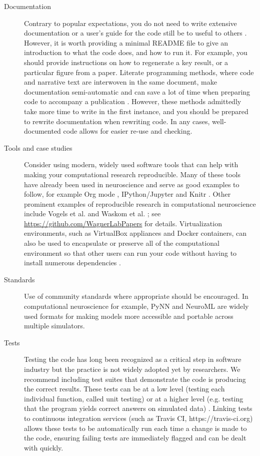 \documentclass[11pt]{article}
\begin{document}
\begin{description}
\item [Documentation] Contrary to popular expectations, you do not
  need to write extensive documentation or a user's guide for the code
  still be to useful to others \cite{Barnes2010-iv}.  However, it is
  worth providing a minimal README file to give an introduction to
  what the code does, and how to run it.  For example, you should
  provide instructions on how to regenerate a key result, or a
  particular figure from a paper. Literate programming methods, where
  code and narrative text are interwoven in the same document, make
  documentation semi-automatic and can save a lot of time when
  preparing code to accompany a publication \cite{schulte2012multi,
    gentleman2012statistical}. However, these methods admittedly take
  more time to write in the first instance, and you should be prepared
  to rewrite documentation when rewriting code.  In any cases,
  well-documented code allows for easier re-use and checking.

\item [Tools and case studies] Consider using modern, widely used software tools that can help with making your computational research reproducible.  Many of
  these tools have already been used in neuroscience and serve as good
  examples to follow, for example Org mode \cite{Delescluse2011},
  IPython/Jupyter \cite{Stevens2013} and Knitr \cite{Eglen2014}.  Other
  prominent examples of reproducible research in computational
  neuroscience include Vogels et al. \cite{Vogels2011-c8c} and Waskom
  et al. \cite{Waskom2014-gd}; see
  \url{https://github.com/WagnerLabPapers} for details.
  Virtualization environments, such as VirtualBox appliances and
  Docker containers, can also be used to
  encapsulate or preserve all of the computational environment so that
  other users can run your code without having to install numerous
  dependencies \cite{Boettiger2015}.

\item [Standards] Use of community standards where appropriate should
  be encouraged. In computational neuroscience for example, PyNN
  \cite{Davison2009} and NeuroML \cite{CannonEtAl2014} are widely used
  formats for making models more accessible and portable across
  multiple simulators.

\item [Tests] Testing the code has long been recognized
  as a critical step in software industry but the practice is not
  widely adopted yet by researchers. We recommend including test
  suites that demonstrate the code is producing the correct
  results\cite{Axelrod2014-xi}. These tests can be at a low level
  (testing each individual function, called unit testing) or at a
  higher level (e.g. testing that the program yields correct answers
  on simulated data) \cite{wilson_best_2014}. Linking tests to continuous 
  integration services (such as Travis CI, https://travis-ci.org) allows 
  these tests to be automatically run each time a change is made to the code,
  ensuring failing tests are immediately flagged and can be dealt with quickly.

\end{description}
\end{document}
